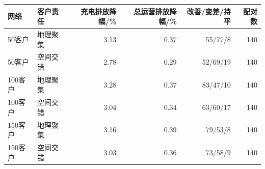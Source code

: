 \begin{tabular*}{0.92\linewidth}{@{\extracolsep{\fill}}llrrrr@{}}
\toprule
网络 & 客户责任 & 充电排放降幅/\% & 总运营排放降幅/\% & 改善/变差/持平 & 配对数 \\
\midrule
50客户 & 地理聚集 & 3.13 & 0.37 & 55/77/8 & 140 \\
50客户 & 空间交错 & 2.78 & 0.29 & 52/69/19 & 140 \\
100客户 & 地理聚集 & 3.28 & 0.37 & 83/47/10 & 140 \\
100客户 & 空间交错 & 3.04 & 0.34 & 63/60/17 & 140 \\
150客户 & 地理聚集 & 3.16 & 0.39 & 79/53/8 & 140 \\
150客户 & 空间交错 & 3.03 & 0.36 & 73/58/9 & 140 \\
\bottomrule
\end{tabular*}
